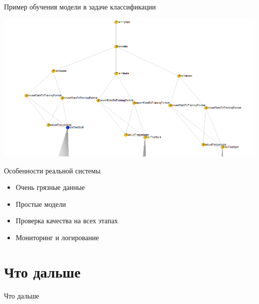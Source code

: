 \documentclass[aspectratio=169]{beamer}
\begin{document}
\begin{frame}{Пример обучения модели в задаче классификации}

\begin{center}
\includegraphics[scale=0.30]{images/podelie.png}
\end{center}

\end{frame}

\begin{frame}{Особенности реальной системы}

\begin{itemize}
\item Очень грязные данные
\item Простые модели
\item Проверка качества на всех этапах
\item Мониторинг и логирование
\end{itemize}

\end{frame}


\section{Что дальше}


\begin{frame}{}

\begin{center}
\Large Что дальше
\end{center}

\end{frame}
\end{document}
